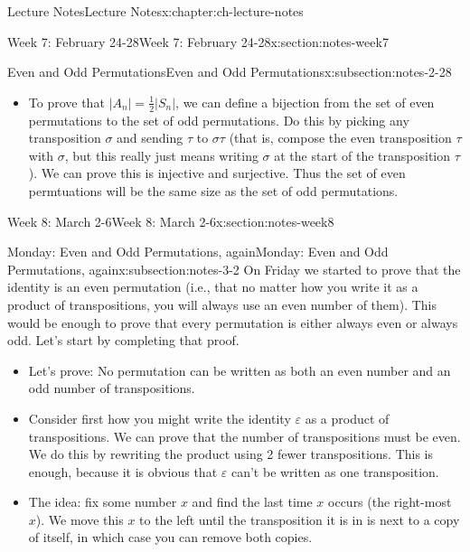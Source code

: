 \documentclass[oneside,11pt,]{book}
\begin{document}
\begin{chapterptx}{Lecture Notes}{}{Lecture Notes}{}{}{x:chapter:ch-lecture-notes}
\begin{sectionptx}{Week 7: February 24-28}{}{Week 7: February 24-28}{}{}{x:section:notes-week7}
\begin{subsectionptx}{Even and Odd Permutations}{}{Even and Odd Permutations}{}{}{x:subsection:notes-2-28}
\begin{itemize}[label=\textbullet]
\item{}To prove that \(|A_n| = \frac{1}{2}|S_n|\), we can define a bijection from the set of even permutations to the set of odd permutations. Do this by picking any transposition \(\sigma\) and sending \(\tau\) to \(\sigma\tau\) (that is, compose the even transposition \(\tau\) with \(\sigma\), but this really just means writing \(\sigma\) at the start of the transposition \(\tau\)). We can prove this is injective and surjective. Thus the set of even permtuations will be the same size as the set of odd permutations.%
\end{itemize}
%
\end{subsectionptx}
\end{sectionptx}
%
%
\typeout{************************************************}
\typeout{************************************************}
%
\begin{sectionptx}{Week 8: March 2-6}{}{Week 8: March 2-6}{}{}{x:section:notes-week8}
%
%
\typeout{************************************************}
\typeout{************************************************}
%
\begin{subsectionptx}{Monday: Even and Odd Permutations, again}{}{Monday: Even and Odd Permutations, again}{}{}{x:subsection:notes-3-2}
On Friday we started to prove that the identity is an even permutation (i.e., that no matter how you write it as a product of transpositions, you will always use an even number of them).  This would be enough to prove that every permutation is either always even or always odd.  Let's start by completing that proof.%
\par
%
\begin{itemize}[label=\textbullet]
\item{}Let’s prove: No permutation can be written as both an even number and an odd number of transpositions.%
\item{}Consider first how you might write the identity \(\varepsilon\) as a product of transpositions. We can prove that the number of transpositions must be even. We do this by rewriting the product using 2 fewer transpositions. This is enough, because it is obvious that \(\varepsilon\) can’t be written as one transposition.%
\item{}The idea: fix some number \(x\) and find the last time \(x\) occurs (the right-most \(x\)). We move this \(x\) to the left until the transposition it is in is next to a copy of itself, in which case you can remove both copies.%

\end{itemize}
\end{subsectionptx}
\end{sectionptx}
\end{chapterptx}
\end{document}
